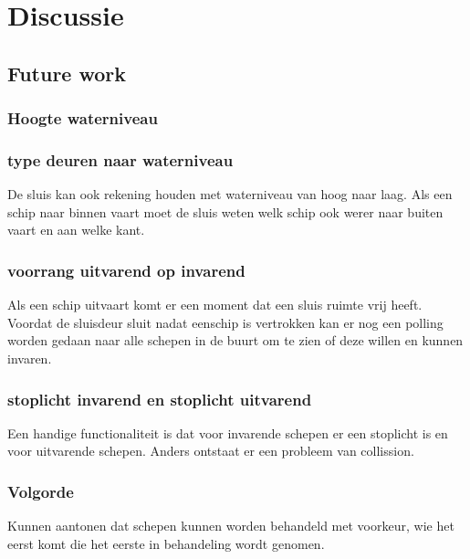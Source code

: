 \newpage
 
\section{Discussie}
\subsection{Future work}
\subsubsection{Hoogte waterniveau}

\subsubsection{type deuren naar waterniveau}
De sluis kan ook rekening houden met waterniveau van hoog naar laag.
Als een schip naar binnen vaart moet de sluis weten welk schip ook werer naar buiten vaart en aan welke kant.

\subsubsection{voorrang uitvarend op invarend}
Als een schip uitvaart komt er een moment dat een sluis ruimte vrij heeft. Voordat de sluisdeur sluit nadat eenschip is vertrokken kan er nog een polling worden gedaan naar alle schepen in de buurt om te zien of deze willen en kunnen invaren.

\subsubsection{stoplicht invarend en stoplicht uitvarend}
Een handige functionaliteit is dat voor invarende schepen er een stoplicht is en voor uitvarende schepen. Anders ontstaat er een probleem van collission. 

\subsubsection{Volgorde}
Kunnen aantonen dat schepen kunnen worden behandeld met voorkeur, wie het eerst komt die het eerste in behandeling wordt genomen.

 


\cite{para}
\cite{nuseibeh2000requirements}
\cite{modelchecking}
\cite{leveson1993investigation}
\cite{royce1987managing}